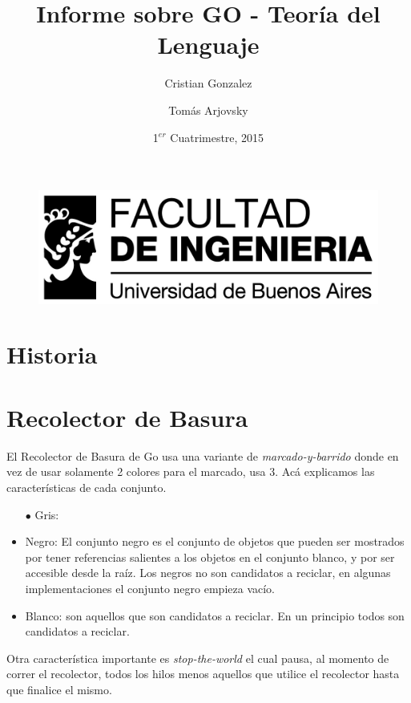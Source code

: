 \documentclass{article}
\begin{document}
\begin{figure}
	\centering
	\includegraphics[width=0.9\linewidth]{./logo_fiuba_alta}
	\label{fig:logo_fiuba_alta}
\end{figure}

\title{Informe sobre GO - Teoría del Lenguaje}
\author{Cristian Gonzalez \and Tomás Arjovsky}
\date{1$^{er}$ Cuatrimestre, 2015}
\maketitle
\section{Historia}
\section{Recolector de Basura}
El Recolector de Basura de Go usa una variante de \textit{marcado-y-barrido} donde en vez de usar solamente 2 colores para el marcado, usa 3. 
Acá explicamos las características de cada conjunto.
\begin{itemize}
\item[$\bullet$] Gris:
\item Negro: El conjunto negro es el conjunto de objetos que pueden ser mostrados por tener referencias salientes a los objetos en el conjunto blanco, y por ser accesible desde la raíz. Los negros no son candidatos a reciclar, en algunas implementaciones el conjunto negro empieza vacío. 
\item Blanco: son aquellos que son candidatos a reciclar. En un principio todos son candidatos a reciclar. 
\end{itemize}

Otra característica importante es \textit{stop-the-world} el cual pausa, al momento de correr el recolector, todos los hilos menos aquellos que utilice el recolector hasta que finalice el mismo. 
\end{document}
